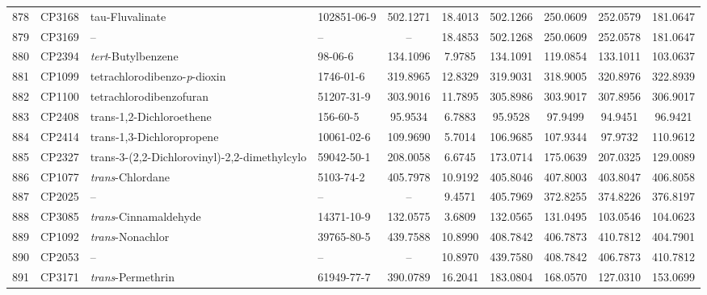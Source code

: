 \begin{longtable}{clllcccccc}
878 & CP3168 & tau-Fluvalinate & 102851-06-9 & 502.1271 & 18.4013 & 502.1266 & 250.0609 & 252.0579 & 181.0647 \\ 
879 & CP3169 & – & – & – & 18.4853 & 502.1268 & 250.0609 & 252.0578 & 181.0647 \\ 
880 & CP2394 & \textit{tert}-Butylbenzene & 98-06-6 & 134.1096 & 7.9785 & 134.1091 & 119.0854 & 133.1011 & 103.0637 \\ 
881 & CP1099 & tetrachlorodibenzo-\textit{p}-dioxin & 1746-01-6 & 319.8965 & 12.8329 & 319.9031 & 318.9005 & 320.8976 & 322.8939 \\ 
882 & CP1100 & tetrachlorodibenzofuran & 51207-31-9 & 303.9016 & 11.7895 & 305.8986 & 303.9017 & 307.8956 & 306.9017 \\ 
883 & CP2408 & trans-1,2-Dichloroethene & 156-60-5 & 95.9534 & 6.7883 & 95.9528 & 97.9499 & 94.9451 & 96.9421 \\ 
884 & CP2414 & trans-1,3-Dichloropropene & 10061-02-6 & 109.9690 & 5.7014 & 106.9685 & 107.9344 & 97.9732 & 110.9612 \\ 
885 & CP2327 & trans-3-(2,2-Dichlorovinyl)-2,2-dimethylcylo\smash{\textsuperscript{\textdaggerdbl}} & 59042-50-1 & 208.0058 & 6.6745 & 173.0714 & 175.0639 & 207.0325 & 129.0089 \\ 
886 & CP1077 & \textit{trans}-Chlordane & 5103-74-2 & 405.7978 & 10.9192 & 405.8046 & 407.8003 & 403.8047 & 406.8058 \\ 
887 & CP2025 & – & – & – & 9.4571 & 405.7969 & 372.8255 & 374.8226 & 376.8197 \\ 
888 & CP3085 & \textit{trans}-Cinnamaldehyde & 14371-10-9 & 132.0575 & 3.6809 & 132.0565 & 131.0495 & 103.0546 & 104.0623 \\ 
889 & CP1092 & \textit{trans}-Nonachlor & 39765-80-5 & 439.7588 & 10.8990 & 408.7842 & 406.7873 & 410.7812 & 404.7901 \\ 
890 & CP2053 & – & – & – & 10.8970 & 439.7580 & 408.7842 & 406.7873 & 410.7812 \\ 
891 & CP3171 & \textit{trans}-Permethrin & 61949-77-7 & 390.0789 & 16.2041 & 183.0804 & 168.0570 & 127.0310 & 153.0699 \\ 
\bottomrule
\end{longtable}
